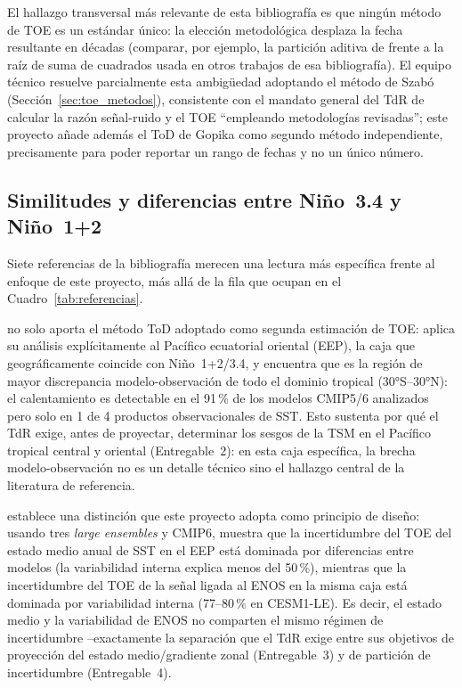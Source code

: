 \documentclass[11pt,a4paper]{article}
\begin{document}
El hallazgo transversal m\'as relevante de esta bibliograf\'ia es que ning\'un m\'etodo de TOE es un est\'andar \'unico: la elecci\'on metodol\'ogica desplaza la fecha resultante en d\'ecadas (comparar, por ejemplo, la partici\'on aditiva de \citealp{szabo2016} frente a la ra\'iz de suma de cuadrados usada en otros trabajos de esa bibliograf\'ia). El equipo t\'ecnico resuelve parcialmente esta ambig\"uedad adoptando el m\'etodo de Szab\'o (Secci\'on~\ref{sec:toe_metodos}), consistente con el mandato general del TdR de calcular la raz\'on se\~nal-ruido y el TOE ``empleando metodolog\'ias revisadas''; este proyecto a\~nade adem\'as el ToD de Gopika como segundo m\'etodo independiente, precisamente para poder reportar un rango de fechas y no un \'unico n\'umero.

\subsection{Similitudes y diferencias entre Ni\~no~3.4 y Ni\~no~1+2}
\label{sec:similitudes}

Siete referencias de la bibliografía merecen una lectura más específica frente al enfoque de este proyecto, más allá de la fila que ocupan en el Cuadro~\ref{tab:referencias}.

\citet{gopika2024} no solo aporta el método ToD adoptado como segunda estimación de TOE: aplica su análisis explícitamente al Pacífico ecuatorial oriental (EEP), la caja que geográficamente coincide con Ni\~no~1+2/3.4, y encuentra que es la región de mayor discrepancia modelo-observación de todo el dominio tropical (30°S--30°N): el calentamiento es detectable en el 91\,\% de los modelos CMIP5/6 analizados pero solo en 1 de 4 productos observacionales de SST. Esto sustenta por qué el TdR exige, antes de proyectar, determinar los sesgos de la TSM en el Pacífico tropical central y oriental (Entregable~2): en esta caja específica, la brecha modelo-observación no es un detalle técnico sino el hallazgo central de la literatura de referencia.

\citet{zhong2023} establece una distinción que este proyecto adopta como principio de diseño: usando tres \emph{large ensembles} y CMIP6, muestra que la incertidumbre del TOE del estado medio anual de SST en el EEP está dominada por diferencias entre modelos (la variabilidad interna explica menos del 50\,\%), mientras que la incertidumbre del TOE de la señal ligada al ENOS en la misma caja está dominada por variabilidad interna (77--80\,\% en CESM1-LE). Es decir, el estado medio y la variabilidad de ENOS no comparten el mismo régimen de incertidumbre --exactamente la separación que el TdR exige entre sus objetivos de proyección del estado medio/gradiente zonal (Entregable~3) y de partición de incertidumbre (Entregable~4).
\end{document}
